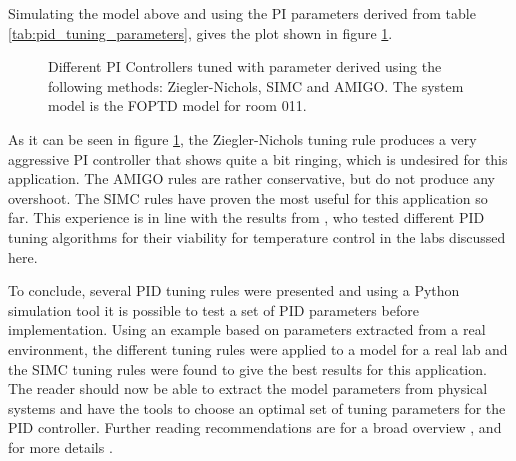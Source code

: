 Simulating the model above and using the PI parameters derived from table \ref{tab:pid_tuning_parameters}, gives the plot shown in figure \ref{fig:pid_controller_comparison}.
\begin{figure}[ht]
    \centering
    \caption{Different PI Controllers tuned with parameter derived using the following methods: Ziegler-Nichols, SIMC and AMIGO. The system model is the FOPTD model for room 011.}
    \label{fig:pid_controller_comparison}
\end{figure}

As it can be seen in figure \ref{fig:pid_controller_comparison}, the Ziegler-Nichols tuning rule produces a very aggressive PI controller that shows quite a bit ringing, which is undesired for this application. The AMIGO rules are rather conservative, but do not produce any overshoot. The SIMC rules have proven the most useful for this application so far. This experience is in line with the results from \citeauthor{thesis_liebmann} \cite{thesis_liebmann}, who tested different PID tuning algorithms for their viability for temperature control in the labs discussed here.

To conclude, several PID tuning rules were presented and using a Python simulation tool it is possible to test a set of PID parameters before implementation. Using an example based on parameters extracted from a real environment, the different tuning rules were applied to a model for a real lab and the SIMC tuning rules were found to give the best results for this application. The reader should now be able to extract the model parameters from physical systems and have the tools to choose an optimal set of tuning parameters for the PID controller. Further reading recommendations are for a broad overview \cite{pid_controller}, and for more details \cite{advanced_pid_control}.

\clearpage
